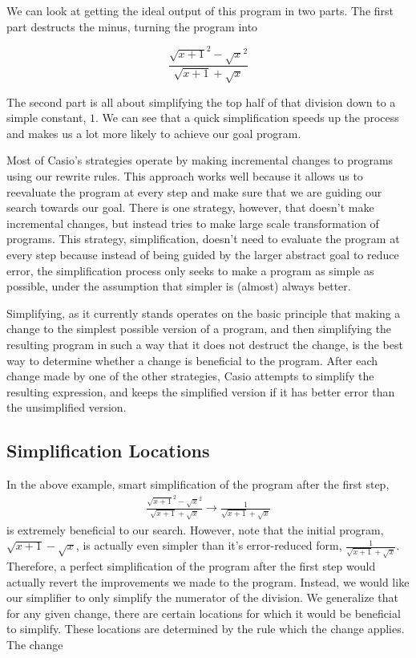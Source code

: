 \documentclass{article}
\newcommand{\sqrsqrt}[1]{\sqrt{#1}^2}
\begin{document}
We can look at getting the ideal output
 of this program 
in two parts. 
The first part destructs the minus, 
turning the program into

\[\frac{\sqrsqrt{x + 1} - \sqrsqrt{x}}{\sqrt{x + 1} + \sqrt{x}}\]

The second part is all about simplifying 
the top half of that division 
down to a simple constant, 
$1$. 
We can see 
that a quick simplification 
speeds up the process 
and makes us a lot more likely 
to achieve our goal program. 

Most of Casio's strategies
operate by making incremental changes 
to programs using our rewrite rules. 
This approach works well 
because it allows us to reevaluate the program 
at every step 
and make sure that we are guiding our search 
towards our goal. 
There is one strategy, however, 
that doesn't make incremental changes, 
but instead tries to make 
large scale transformation of programs. 
This strategy, simplification, 
doesn't need to evaluate 
the program at every step 
because instead of being guided 
by the larger abstract goal 
to reduce error, 
the simplification process only seeks 
to make a program as simple as possible, 
under the assumption that 
simpler is (almost) always better.

Simplifying, 
as it currently stands 
operates on the basic principle 
that making a change to the 
simplest possible version of a program, 
and then simplifying the resulting program 
in such a way that 
it does not destruct the change, 
is the best way to determine 
whether a change is beneficial 
to the program.
After each change made by one of the other strategies,
Casio attempts to simplify the resulting expression,
and keeps the simplified version
if it has better error than the unsimplified version.

\subsection{Simplification Locations}

In the above example,
smart simplification of the program after the first step,
\begin{align*}
\frac{\sqrsqrt{x+1} - \sqrsqrt{x}}{\sqrt{x+1} + \sqrt{x}}
\to \frac{1}{\sqrt{x+1}+\sqrt{x}}
\end{align*}
is extremely beneficial to our search.
However, note that the initial program, 
$\sqrt{x+1}-\sqrt{x}$,
is actually even simpler than it's error-reduced form,
$\frac{1}{\sqrt{x+1}+\sqrt{x}}$.
Therefore, a perfect simplification
of the program after the first step
would actually revert
the improvements we made to the program.
Instead, we would like our simplifier
to only simplify
the numerator of the division.
We generalize that for any given change, 
there are certain locations 
for which it would be beneficial to simplify. 
These locations are determined 
by the rule which the change applies. 
The change
\end{document}
